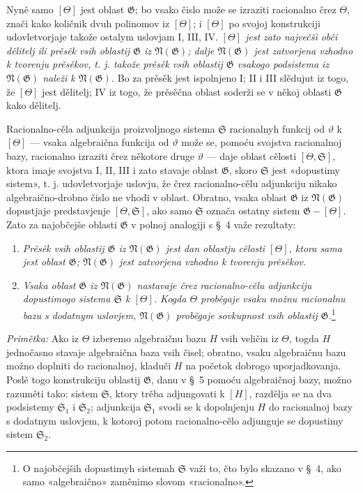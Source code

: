 \documentclass[11pt]{article}
\begin{document}
Nyně samo $[\Theta]$ jest oblast $\mathfrak G$; bo vsako čislo može se izraziti
racionalno črez $\Theta$, znači kako količnik dvuh polinomov iz $[\Theta]$; i
$[\Theta]$ po svojoj konstrukciji udovletvorjaje takože ostalym uslovjam I, III,
IV. {\itshape $[\Theta]$ jest zato največši obči dělitelj ili prěsěk vsih
oblastij $\mathfrak G$ iz $\mathfrak N(\mathfrak G)$; dalje
$\mathfrak N(\mathfrak G)$ jest zatvorjena vzhodno k tvorenju prěsěkov, t. j.
takože prěsěk vsih oblastij $\mathfrak G$ vsakogo podsistema iz
$\mathfrak N(\mathfrak G)$ naleži k $\mathfrak N(\mathfrak G)$.} Bo za prěsěk
jest ispolnjeno I; II i III slědujut iz togo, že $[\Theta]$ jest dělitelj; IV iz
togo, že prěsěčna oblast soderži se v někoj oblasti $\mathfrak G$ kako
dělitelj.

Racionalno-cěla adjunkcija proizvoljnogo sistema $\mathfrak S$ racionalnyh
funkcij od $\vartheta$ k $[\Theta]$ --- vsaka algebraična funkcija od
$\vartheta$ može se, pomoću svojstva racionalnoj bazy, racionalno izraziti črez
někotore druge $\vartheta$ --- daje oblast cělosti $[\Theta,\mathfrak S]$,
ktora imaje svojstva I, II, III i zato stavaje oblast $\mathfrak G$, skoro
$\mathfrak S$ jest «dopustimy sistem», t. j. udovletvorjaje uslovju, že črez
racionalno-cělu adjunkciju nikako algebraično-drobno čislo ne vhodi v oblast.
Obratno, vsaka oblast $\mathfrak G$ iz $\mathfrak N(\mathfrak G)$ dopustjaje
predstavjenje $[\Theta,\mathfrak S]$, ako samo $\mathfrak S$ označa ostatny
sistem $\mathfrak G-[\Theta]$. Zato za najobčejše oblasti $\mathfrak G$ v polnoj
analogiji s \S\ 4 važe rezultaty:
\begin{enumerate}
\item[a)] {\itshape Prěsěk vsih oblastij $\mathfrak G$ iz
$\mathfrak N(\mathfrak G)$ jest dan oblastju cělosti $[\Theta]$, ktora sama
jest oblast $\mathfrak G$; $\mathfrak N(\mathfrak G)$ jest zatvorjena vzhodno k
tvorenju prěsěkov.}
\item[b)] {\itshape Vsaka oblast $\mathfrak G$ iz $\mathfrak N(\mathfrak G)$
nastavaje črez racionalno-cělu adjunkciju dopustimogo sistema $\mathfrak S$ k
$[\Theta]$. Kogda $\Theta$ proběgaje vsaku možnu racionalnu bazu s dodatnym
uslovjem, $\mathfrak N(\mathfrak G)$ proběgaje sovkupnost vsih oblastij
$\mathfrak G$.}\footnote{O najobčejših dopustimyh sistemah $\mathfrak S$ važi
to, čto bylo skazano v \S\ 4, ako samo «algebraično» zaměnimo slovom
«racionalno».}
\end{enumerate}

{\itshape Primětka:} Ako iz $\Theta$ izberemo algebraičnu bazu $H$ vsih veličin
iz $\Theta$, togda $H$ jednočasno stavaje algebraična baza vsih čisel; obratno,
vsaku algebraičnu bazu možno doplniti do racionalnoj, kladuči $H$ na početok
dobrogo uporjadkovanja. Poslě togo konstrukciju oblastij $\mathfrak G$, danu v
\S\ 5 pomoću algebraičnoj bazy, možno razuměti tako: sistem $\mathfrak S$, ktory
trěba adjungovati k $[H]$, razdělja se na dva podsistemy $\mathfrak S_1$ i
$\mathfrak S_2$; adjunkcija $\mathfrak S_1$ svodi se k dopolnjenju $H$ do
racionalnoj bazy s dodatnym uslovjem, k kotoroj potom racionalno-cělo
adjunguje se dopustimy sistem $\mathfrak S_2$.
\end{document}
